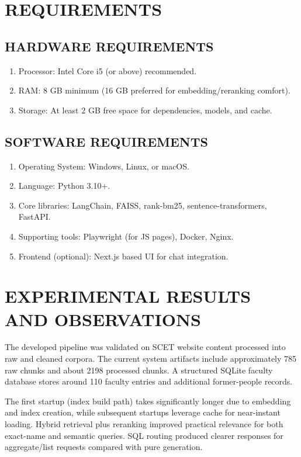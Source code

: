 \documentclass[12pt,a4paper]{report}
\begin{document}
\chapter{REQUIREMENTS}
\thispagestyle{fancy}
\onehalfspacing

\section{HARDWARE REQUIREMENTS}
\begin{enumerate}
    \item Processor: Intel Core i5 (or above) recommended.
    \item RAM: 8 GB minimum (16 GB preferred for embedding/reranking comfort).
    \item Storage: At least 2 GB free space for dependencies, models, and cache.
\end{enumerate}

\section{SOFTWARE REQUIREMENTS}
\begin{enumerate}
    \item Operating System: Windows, Linux, or macOS.
    \item Language: Python 3.10+.
    \item Core libraries: LangChain, FAISS, rank-bm25, sentence-transformers, FastAPI.
    \item Supporting tools: Playwright (for JS pages), Docker, Nginx.
    \item Frontend (optional): Next.js based UI for chat integration.
\end{enumerate}

\chapter{EXPERIMENTAL RESULTS AND OBSERVATIONS}
\thispagestyle{fancy}
\onehalfspacing

\hspace*{1cm}The developed pipeline was validated on SCET website content processed into raw and cleaned corpora. The current system artifacts include approximately 785 raw chunks and about 2198 processed chunks. A structured SQLite faculty database stores around 110 faculty entries and additional former-people records.

\hspace*{1cm}The first startup (index build path) takes significantly longer due to embedding and index creation, while subsequent startups leverage cache for near-instant loading. Hybrid retrieval plus reranking improved practical relevance for both exact-name and semantic queries. SQL routing produced clearer responses for aggregate/list requests compared with pure generation.
\end{document}
